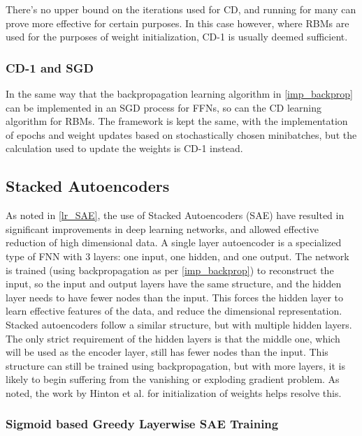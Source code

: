 \documentclass[a4paper,11pt,oneside]{article}
\theoremstyle{plain}
\theoremstyle{definition}
\begin{document}
	There's no upper bound on the iterations used for CD, and running for many can prove more effective for certain purposes. In this case however, where RBMs are used for the purposes of weight initialization, CD-1 is usually deemed sufficient.
	
	\subsubsection{CD-1 and SGD}
	
	In the same way that the backpropagation learning algorithm in \ref{imp_backprop} can be implemented in an SGD process for FFNs, so can the CD learning algorithm for RBMs. The framework is kept the same, with the implementation of epochs and weight updates based on stochastically chosen minibatches, but the calculation used to update the weights is CD-1 instead.
	
	
	\subsection{Stacked Autoencoders}\label{imp_SAE}
	
	As noted in \ref{lr_SAE}, the use of Stacked Autoencoders (SAE) have resulted in significant improvements in deep learning networks, and allowed effective reduction of high dimensional data. A single layer autoencoder is a specialized type of FNN with 3 layers: one input, one hidden, and one output. The network is trained (using backpropagation as per \ref{imp_backprop}) to reconstruct the input, so the input and output layers have the same structure, and the hidden layer needs to have fewer nodes than the input. This forces the hidden layer to learn effective features of the data, and reduce the dimensional representation. 
	\newline\newline
	Stacked autoencoders follow a similar structure, but with multiple hidden layers. The only strict requirement of the hidden layers is that the middle one, which will be used as the encoder layer, still has fewer nodes than the input. This structure can still be trained using backpropagation, but with more layers, it is likely to begin suffering from the vanishing or exploding gradient problem. As noted, the work by Hinton et al. for initialization of weights helps resolve this.
	
	\subsubsection{Sigmoid based Greedy Layerwise SAE Training}\label{imp_sigmoidsae}
	
\end{document}
